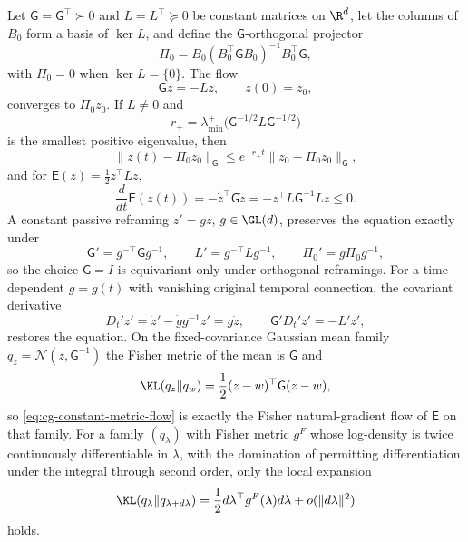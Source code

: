 Let \(\mathsf G=\mathsf G^\top\succ0\) and \(L=L^\top\succeq0\) be constant
matrices on \(\R^d\), let the columns of \(B_0\) form a basis of \(\ker L\), and
define the \(\mathsf G\)-orthogonal projector
\begin{equation}
\Pi_0=B_0(B_0^\top\mathsf GB_0)^{-1}B_0^\top\mathsf G,
\label{eq:cg-r-projector}
\end{equation}
with \(\Pi_0=0\) when \(\ker L=\{0\}\). The flow
\begin{equation}
\mathsf G\dot z=-Lz,\qquad z(0)=z_0,
\label{eq:cg-constant-metric-flow}
\end{equation}
converges to \(\Pi_0z_0\). If \(L\neq0\) and
\begin{equation}
r_+=\lambda_{\min}^{+}\bigl(\mathsf G^{-1/2}L\mathsf G^{-1/2}\bigr)
\label{eq:cg-transverse-rate}
\end{equation}
is the smallest positive eigenvalue, then
\begin{equation}
\|z(t)-\Pi_0z_0\|_{\mathsf G}
\leq e^{-r_+t}
\|z_0-\Pi_0z_0\|_{\mathsf G},
\label{eq:cg-transverse-decay}
\end{equation}
and for \(\mathsf E(z)=\frac12z^\top Lz\),
\begin{equation}
\frac{d}{dt}\mathsf E(z(t))
=-\dot z^\top\mathsf G\dot z
=-z^\top L\mathsf G^{-1}Lz\leq0.
\label{eq:cg-fixed-flow-dissipation}
\end{equation}
A constant passive reframing \(z'=gz\), \(g\in\GL(d)\), preserves the equation
exactly under
\begin{equation}
\mathsf G'=g^{-\top}\mathsf Gg^{-1},\qquad
L'=g^{-\top}Lg^{-1},\qquad
\Pi_0'=g\Pi_0g^{-1},
\label{eq:cg-flow-congruence}
\end{equation}
so the choice \(\mathsf G=I\) is equivariant only under orthogonal reframings.
For a time-dependent \(g=g(t)\) with vanishing original temporal connection, the
covariant derivative
\begin{equation}
D_t'z'=\dot z'-\dot gg^{-1}z'=g\dot z,
\qquad \mathsf G'D_t'z'=-L'z',
\label{eq:cg-time-covariant-flow}
\end{equation}
restores the equation. On the fixed-covariance Gaussian mean family
\(q_z=\mathcal N(z,\mathsf G^{-1})\) the Fisher metric of the mean is
\(\mathsf G\) and
\begin{equation}
\KL(q_z\Vert q_w)
=\frac12(z-w)^\top\mathsf G(z-w),
\label{eq:cg-fixed-covariance-kl}
\end{equation}
so \eqref{eq:cg-constant-metric-flow} is exactly the Fisher natural-gradient
flow of \(\mathsf E\) on that family. For a family \((q_\lambda)\) with Fisher
metric \(g^F\) whose log-density is twice continuously differentiable in
\(\lambda\), with the domination of  permitting
differentiation under the integral through second order, only the local
expansion
\begin{equation}
\KL(q_\lambda\Vert q_{\lambda+d\lambda})
=\frac12d\lambda^\top g^F(\lambda)d\lambda
+o(\|d\lambda\|^2)
\label{eq:cg-local-fisher-kl}
\end{equation}
holds. 

